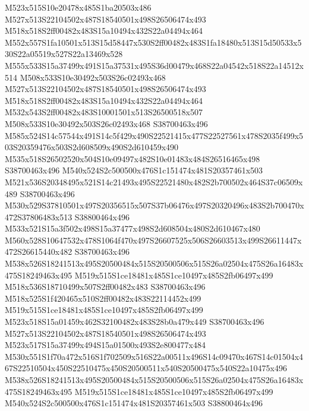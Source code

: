 \documentclass{article}
\begin{document}
\begin{multicols}{2}
M523x515S10e20478x485S1ba20503x486 M527x513S22104502x487S18540501x498S26506474x493 M518x518S2ff00482x483S15a10494x432S22a04494x464 M552x557S1fa10501x513S15d58447x530S2ff00482x483S1fa18480x513S15d50533x530S22a05519x527S22a13469x528 M555x533S15a37499x491S15a37531x495S36d00479x468S22a04542x518S22a14512x514 M508x533S10e30492x503S26c02493x468 M527x513S22104502x487S18540501x498S26506474x493 M518x518S2ff00482x483S15a10494x432S22a04494x464 M532x543S2ff00482x483S10001501x513S26500518x507 M508x533S10e30492x503S26c02493x468 S38700463x496 M585x524S14c57544x491S14c5f429x490S22521415x477S22527561x478S2035f499x503S20359476x503S2d608509x490S2d610459x490 M535x518S26502520x504S10e09497x482S10e01483x484S26516465x498 S38700463x496 M540x524S2c500500x476S1c151474x481S20357461x503 M521x536S20348495x521S14c21493x495S22521480x482S2b700502x464S37c06509x489 S38700463x496 M530x529S37810501x497S20356515x507S37b06476x497S20320496x483S2b700470x472S37806483x513 S38800464x496 M533x521S15a3f502x498S15a37477x498S2d608504x480S2d610467x480 M560x528S10647532x478S1064f470x497S26607525x506S26603513x499S26611447x472S26615440x482 S38700463x496 M538x526S18241513x495S20500484x515S20500506x515S26a02504x475S26a16483x475S18249463x495 M519x515S1ce18481x485S1ce10497x485S2fb06497x499 M518x536S18710499x507S2ff00482x483 S38700463x496 M518x525S1f420465x510S2ff00482x483S22114452x499 M519x515S1ce18481x485S1ce10497x485S2fb06497x499 M523x518S15a01459x462S32100482x483S28b0a479x449 S38700463x496 M527x513S22104502x487S18540501x498S26506474x493 M523x517S15a37499x494S15a01500x493S2e800477x484 M530x551S1f70a472x516S1f702509x516S22a00511x496S14c09470x467S14c01504x467S22510504x450S22510475x450S20500511x540S20500475x540S22a10475x496 M538x526S18241513x495S20500484x515S20500506x515S26a02504x475S26a16483x475S18249463x495 M519x515S1ce18481x485S1ce10497x485S2fb06497x499 M540x524S2c500500x476S1c151474x481S20357461x503 S38800464x496


\end{multicols}
\end{document}
